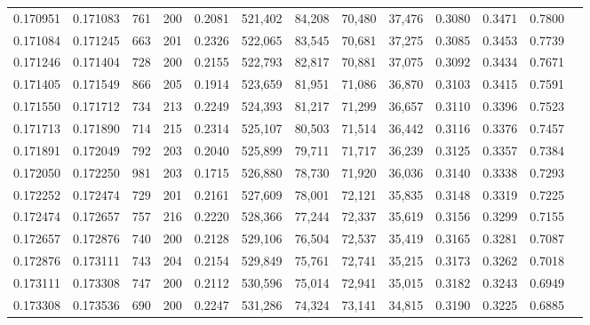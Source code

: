 \begin{tabular}{rrrrrrrrrrrrr}
0.170951 & 0.171083 &   761 & 200 &                                     0.2081 & 521,402 &  84,208 &  70,480 &  37,476 & 0.3080 & 0.3471 & 0.7800 \\
0.171084 & 0.171245 &   663 & 201 &                                     0.2326 & 522,065 &  83,545 &  70,681 &  37,275 & 0.3085 & 0.3453 & 0.7739 \\
0.171246 & 0.171404 &   728 & 200 &                                     0.2155 & 522,793 &  82,817 &  70,881 &  37,075 & 0.3092 & 0.3434 & 0.7671 \\
0.171405 & 0.171549 &   866 & 205 &                                     0.1914 & 523,659 &  81,951 &  71,086 &  36,870 & 0.3103 & 0.3415 & 0.7591 \\
0.171550 & 0.171712 &   734 & 213 &                                     0.2249 & 524,393 &  81,217 &  71,299 &  36,657 & 0.3110 & 0.3396 & 0.7523 \\
0.171713 & 0.171890 &   714 & 215 &                                     0.2314 & 525,107 &  80,503 &  71,514 &  36,442 & 0.3116 & 0.3376 & 0.7457 \\
0.171891 & 0.172049 &   792 & 203 &                                     0.2040 & 525,899 &  79,711 &  71,717 &  36,239 & 0.3125 & 0.3357 & 0.7384 \\
0.172050 & 0.172250 &   981 & 203 &                                     0.1715 & 526,880 &  78,730 &  71,920 &  36,036 & 0.3140 & 0.3338 & 0.7293 \\
0.172252 & 0.172474 &   729 & 201 &                                     0.2161 & 527,609 &  78,001 &  72,121 &  35,835 & 0.3148 & 0.3319 & 0.7225 \\
0.172474 & 0.172657 &   757 & 216 &                                     0.2220 & 528,366 &  77,244 &  72,337 &  35,619 & 0.3156 & 0.3299 & 0.7155 \\
0.172657 & 0.172876 &   740 & 200 &                                     0.2128 & 529,106 &  76,504 &  72,537 &  35,419 & 0.3165 & 0.3281 & 0.7087 \\
0.172876 & 0.173111 &   743 & 204 &                                     0.2154 & 529,849 &  75,761 &  72,741 &  35,215 & 0.3173 & 0.3262 & 0.7018 \\
0.173111 & 0.173308 &   747 & 200 &                                     0.2112 & 530,596 &  75,014 &  72,941 &  35,015 & 0.3182 & 0.3243 & 0.6949 \\
0.173308 & 0.173536 &   690 & 200 &                                     0.2247 & 531,286 &  74,324 &  73,141 &  34,815 & 0.3190 & 0.3225 & 0.6885 \\

\end{tabular}
